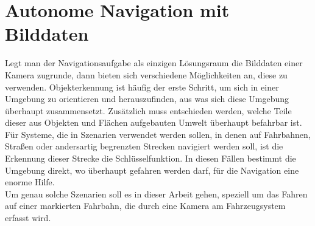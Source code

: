 \section{Autonome Navigation mit Bilddaten}
\label{sec:Autonome Navigation mit Bilddaten}
Legt man der Navigationsaufgabe als einzigen Lösungsraum die Bilddaten einer Kamera zugrunde, dann bieten sich verschiedene Möglichkeiten an, diese zu verwenden. Objekterkennung ist häufig der erste Schritt, um sich in einer Umgebung zu orientieren und herauszufinden, aus was sich diese Umgebung überhaupt zusammensetzt. Zusätzlich muss entschieden werden, welche Teile dieser aus Objekten und Flächen aufgebauten Umwelt überhaupt befahrbar ist.
Für Systeme, die in Szenarien verwendet werden sollen, in denen auf Fahrbahnen, Straßen oder andersartig begrenzten Strecken navigiert werden soll, ist die Erkennung dieser Strecke die Schlüsselfunktion. In diesen Fällen bestimmt die Umgebung direkt, wo überhaupt gefahren werden darf, für die Navigation eine enorme Hilfe.\\
Um genau solche Szenarien soll es in dieser Arbeit gehen, speziell um das Fahren auf einer markierten Fahrbahn, die durch eine Kamera am Fahrzeugsystem erfasst wird.




